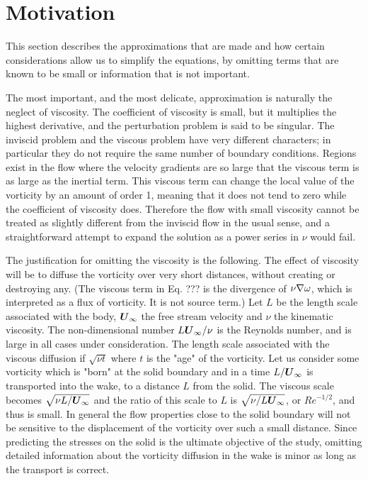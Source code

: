 
\section{Motivation}

This section describes the approximations that are made and how certain considerations allow us to simplify the equations, by omitting terms that are known to be small or information that is not important.

The most important, and the most delicate, approximation is naturally the neglect of viscosity.
The coefficient of viscosity is small, but it multiplies the highest derivative, and the perturbation problem is said to be singular.
The inviscid problem and the viscous problem have very different characters; in particular they do not require the same number of boundary conditions.
Regions exist in the flow where the velocity gradients are so large that the viscous term is as large as the inertial term.
This viscous term can change the local value of the vorticity by an amount of order 1, meaning that it does not tend to zero while the coefficient of viscosity does.
Therefore the flow with small viscosity cannot be treated as slightly different from the inviscid flow in the usual sense, and a straightforward attempt to expand the solution as a power series in $\nu$ would fail.

The justification for omitting the viscosity is the following.
The effect of viscosity will be to diffuse the vorticity over very short distances, without creating or destroying any.
(The viscous term in Eq. ??? is the divergence of $\nu \nabla \omega$, which is interpreted as a flux of vorticity. It is not source term.)
Let $L$ be the length scale associated with the body, $\boldsymbol{U}_{\infty}$ the free stream velocity and $\nu$ the kinematic viscosity.
The non-dimensional number $L\boldsymbol{U}_{\infty}/\nu$ is the Reynolds number, and is large in all cases under consideration.
The length scale associated with the viscous diffusion if $\sqrt{\nu t}$ where $t$ is the "age" of the vorticity.
Let us consider some vorticity which is "born" at the solid boundary and in a time $L/\boldsymbol{U}_{\infty}$ is transported into the wake, to a distance $L$ from the solid.
The viscous scale becomes $\sqrt{\nu L/\boldsymbol{U}_{\infty}}$ and the ratio of this scale to $L$ is $\sqrt{\nu/L\boldsymbol{U}_{\infty}}$, or $Re^{-1/2}$, and thus is small.
In general the flow properties close to the solid boundary will not be sensitive to the displacement of the vorticity over such a small distance.
Since predicting the stresses on the solid is the ultimate objective of the study, omitting detailed information about the vorticity diffusion in the wake is minor as long as the transport is correct.

